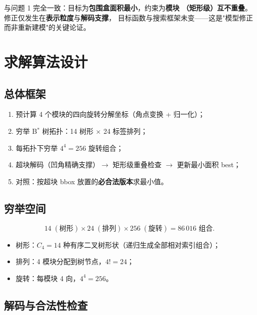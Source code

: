 \documentclass[12pt,a4paper]{article}
\begin{document}
与问题 1 完全一致：目标为\textbf{包围盒面积最小}，约束为\textbf{模块
（矩形级）互不重叠}。修正仅发生在\textbf{表示粒度}与\textbf{解码支撑}，
目标函数与搜索框架未变——这是"模型修正而非重新建模"的关键论证。

\section{求解算法设计}

\subsection{总体框架}

\begin{tcolorbox}[colback=blue!5, colframe=blue!60, title=算法流程]
\begin{enumerate}
    \item 预计算 4 个模块的四向旋转分解坐标（角点变换 + 归一化）；
    \item 穷举 B$^*$ 树拓扑：14 树形 $\times$ 24 标签排列；
    \item 每拓扑下穷举 $4^4 = 256$ 旋转组合；
    \item 超块解码（凹角精确支撑）$\rightarrow$ 矩形级重叠检查
    $\rightarrow$ 更新最小面积 best；
    \item 对照：按超块 bbox 放置的\textbf{必合法版本}求最小值。
\end{enumerate}
\end{tcolorbox}

\subsection{穷举空间}

\begin{equation}
14 \;(\text{树形}) \times 24 \;(\text{排列}) \times 256 \;(\text{旋转})
= 86\,016 \text{ 组合}.
\end{equation}

\begin{itemize}
    \item 树形：$C_4 = 14$ 种有序二叉树形状（递归生成全部相对索引组合）；
    \item 排列：4 模块分配到树节点，$4! = 24$；
    \item 旋转：每模块 4 向，$4^4 = 256$。
\end{itemize}

\subsection{解码与合法性检查}
\end{document}

